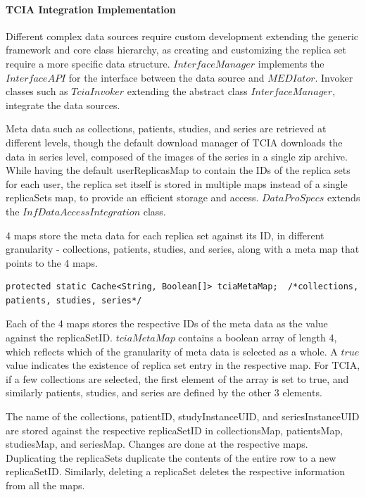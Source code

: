 \documentclass[letterpaper, 10 pt, conference]{ieeeconf}  %
\begin{document}
\paragraph*{\textbf{TCIA Integration Implementation}}
Different complex data sources require custom development extending the generic framework and core class hierarchy, as creating and customizing the replica set require a more specific data structure. $InterfaceManager$ implements the $InterfaceAPI$ for the interface between the data source and $MEDIator$. Invoker classes such as $TciaInvoker$ extending the abstract class $InterfaceManager$, integrate the data sources.

Meta data such as collections, patients, studies, and series are retrieved at different levels, though the default download manager of TCIA downloads the data in series level, composed of the images of the series in a single zip archive. While having the default userReplicasMap to contain the IDs of the replica sets for each user, the replica set itself is stored in multiple maps instead of a single replicaSets map, to provide an efficient storage and access. $DataProSpecs$ extends the $InfDataAccessIntegration$ class. 

4 maps store the meta data for each replica set against its ID, in different granularity - collections, patients, studies, and series, along with a meta map that points to the 4 maps. 
\vspace{-25pt}
\begin{lstlisting}  
protected static Cache<String, Boolean[]> tciaMetaMap;  /*collections, patients, studies, series*/
\end{lstlisting} 
\vspace{-9pt}
Each of the 4 maps stores the respective IDs of the meta data as the value against the replicaSetID. $tciaMetaMap$ contains a boolean array of length 4, which reflects which of the granularity of meta data is selected as a whole. A $true$ value indicates the existence of replica set entry in the respective map. For TCIA, if a few collections are selected, the first element of the array is set to true, and similarly patients, studies, and series are defined by the other 3 elements.

The name of the collections, patientID, studyInstanceUID, and seriesInstanceUID are stored against the respective replicaSetID in collectionsMap, patientsMap, studiesMap, and seriesMap. Changes are done at the respective maps. Duplicating the replicaSets duplicate the contents of the entire row to a new replicaSetID. Similarly, deleting a replicaSet deletes the respective information from all the maps. 
\end{document}
